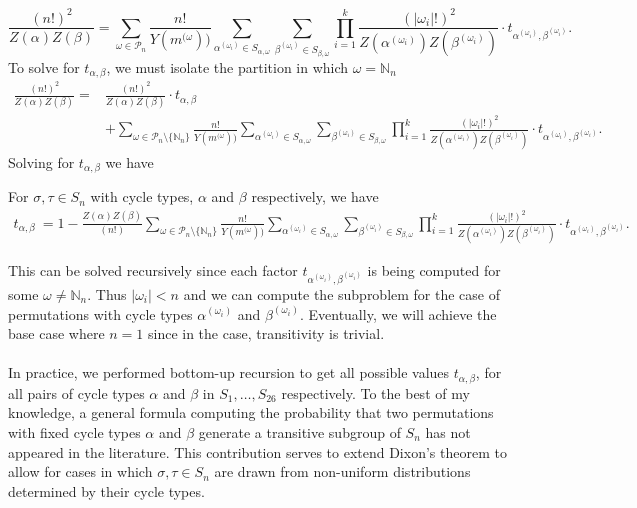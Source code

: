 \[
    \frac{(n!)^2}{Z(\alpha)Z(\beta)} = \sum_{\omega\in\mathcal{P}_n}\frac{n!}{Y(m^{(\omega}))}\sum_{\alpha^{(\omega_i)}\in S_{\alpha,\omega}}\sum_{\beta^{(\omega_i)}\in S_{\beta,\omega}}\prod_{i=1}^k
{\frac{(|\omega_i|!)^2}{Z(\alpha^{(\omega_i)})Z(\beta^{(\omega_i)})}}\cdot t_{\alpha^{(\omega_i)},\beta^{(\omega_i)}}.
\]
To solve for $t_{\alpha,\beta}$, we must isolate the partition in which $\omega=\mathbb{N}_n$
\begin{align*}
    \frac{(n!)^2}{Z(\alpha)Z(\beta)} = &\frac{(n!)^2}{Z(\alpha)Z(\beta)}\cdot t_{\alpha, \beta}\\
    &+ \sum_{\omega\in\mathcal{P}_n \setminus \{\mathbb{N}_n\}}\frac{n!}{Y(m^{(\omega}))}\sum_{\alpha^{(\omega_i)}\in S_{\alpha,\omega}}\sum_{\beta^{(\omega_i)}\in S_{\beta,\omega}}\prod_{i=1}^k
{\frac{(|\omega_i|!)^2}{Z(\alpha^{(\omega_i)})Z(\beta^{(\omega_i)})}}\cdot t_{\alpha^{(\omega_i)},\beta^{(\omega_i)}}.
\end{align*}
Solving for $t_{\alpha,\beta}$ we have
\begin{theorem}
For $\sigma,\tau\in S_n$ with cycle types, $\alpha$ and $\beta$ respectively, we have 
\begin{align*}
    t_{\alpha, \beta}\ = 1 - \frac{Z(\alpha)Z(\beta)}{(n!)}\sum_{\omega\in\mathcal{P}_n \setminus\{\mathbb{N}_n\}}\frac{n!}{Y(m^{(\omega}))}\sum_{\alpha^{(\omega_i)}\in S_{\alpha,\omega}}\sum_{\beta^{(\omega_i)}\in S_{\beta,\omega}}\prod_{i=1}^k
{\frac{(|\omega_i|!)^2}{Z(\alpha^{(\omega_i)})Z(\beta^{(\omega_i)})}}\cdot t_{\alpha^{(\omega_i)},\beta^{(\omega_i)}}.
\end{align*}
\end{theorem}
\noindent This can be solved recursively since each factor $t_{\alpha^{(\omega_i)},\beta^{(\omega_i)}}$ is being computed for some $\omega \ne \mathbb{N}_n$. Thus $|\omega_i| < n$ and we can compute the subproblem for the case of permutations with cycle types $\alpha^{(\omega_i)}$ and $\beta^{(\omega_i)}$. Eventually, we will achieve the base case where $n = 1$ since in the case, transitivity is trivial. 
\\\\In practice, we performed bottom-up recursion to get all possible values $t_{\alpha,\beta}$, for all pairs of cycle types $\alpha$ and $\beta$ in $S_1, \dots, S_{26}$ respectively. To the best of my knowledge, a general formula computing the probability that two permutations with fixed cycle types $\alpha$ and $\beta$ generate a transitive subgroup of $S_n$ has not appeared in the literature. This contribution serves to extend Dixon's theorem to allow for cases in which $\sigma,\tau\in S_n$ are drawn from non-uniform distributions determined by their cycle types.

